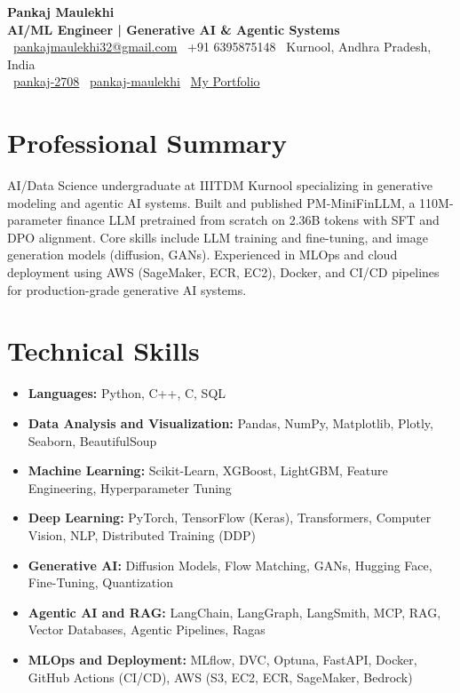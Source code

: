 \documentclass[a4paper,9pt]{extarticle}
\begin{document}
\pagestyle{empty}

\begin{center}
    \textbf{\Large Pankaj Maulekhi}\\[2pt]
    \textbf{AI/ML Engineer | Generative AI \& Agentic Systems}\\[1pt]
    \faEnvelope\ \href{mailto:pankajmaulekhi32@gmail.com}{pankajmaulekhi32@gmail.com} \quad
    \faPhone\ +91 6395875148 \quad
    \faMapMarker*\ Kurnool, Andhra Pradesh, India \\[1pt]
    \faGithub\ \href{https://github.com/pankaj-2708}{pankaj-2708} \quad
    \faLinkedin\ \href{https://www.linkedin.com/in/pankaj-maulekhi/}{pankaj-maulekhi} \quad
    \faGlobe\ \href{https://pankaj-2708.github.io/pankaj-2708/}{My Portfolio}
\end{center}

\vspace{-4pt}

\section*{Professional Summary}
\vspace{2pt}

AI/Data Science undergraduate at IIITDM Kurnool specializing in generative modeling and agentic AI systems. Built and published PM-MiniFinLLM, a 110M-parameter finance LLM pretrained from scratch on 2.36B tokens with SFT and DPO alignment. Core skills include LLM training and fine-tuning, and image generation models (diffusion, GANs). Experienced in MLOps and cloud deployment using AWS (SageMaker, ECR, EC2), Docker, and CI/CD pipelines for production-grade generative AI systems.
\section*{Technical Skills}
\vspace{2pt}
\begin{itemize}[leftmargin=*, itemsep=0.12em]
  \item \textbf{Languages:} Python, C++, C, SQL
  \item \textbf{Data Analysis and Visualization:} Pandas, NumPy, Matplotlib, Plotly, Seaborn, BeautifulSoup
  \item \textbf{Machine Learning:} Scikit-Learn, XGBoost, LightGBM, Feature Engineering, Hyperparameter Tuning
  \item \textbf{Deep Learning:} PyTorch, TensorFlow (Keras), Transformers, Computer Vision, NLP, Distributed Training (DDP)
  \item \textbf{Generative AI:} Diffusion Models, Flow Matching, GANs, Hugging Face, Fine-Tuning, Quantization
  \item \textbf{Agentic AI and RAG:} LangChain, LangGraph, LangSmith, MCP, RAG, Vector Databases, Agentic Pipelines, Ragas
  \item \textbf{MLOps and Deployment:} MLflow, DVC, Optuna, FastAPI, Docker, GitHub Actions (CI/CD), AWS (S3, EC2, ECR, SageMaker, Bedrock)
\end{itemize}
\end{document}
